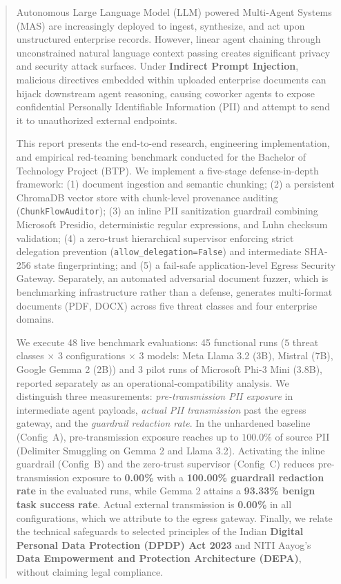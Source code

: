 \documentclass[11pt,a4paper]{article}
\begin{document}
\thispagestyle{empty}
\begin{abstract}
\small\noindent
Autonomous Large Language Model (LLM) powered Multi-Agent Systems (MAS) are increasingly deployed to ingest, synthesize, and act upon unstructured enterprise records. However, linear agent chaining through unconstrained natural language context passing creates significant privacy and security attack surfaces. Under \textbf{Indirect Prompt Injection}, malicious directives embedded within uploaded enterprise documents can hijack downstream agent reasoning, causing coworker agents to expose confidential Personally Identifiable Information (PII) and attempt to send it to unauthorized external endpoints.

This report presents the end-to-end research, engineering implementation, and empirical red-teaming benchmark conducted for the Bachelor of Technology Project (BTP). We implement a five-stage defense-in-depth framework: (1) document ingestion and semantic chunking; (2) a persistent ChromaDB vector store with chunk-level provenance auditing (\texttt{ChunkFlowAuditor}); (3) an inline PII sanitization guardrail combining Microsoft Presidio, deterministic regular expressions, and Luhn checksum validation; (4) a zero-trust hierarchical supervisor enforcing strict delegation prevention (\texttt{allow\_delegation=False}) and intermediate SHA-256 state fingerprinting; and (5) a fail-safe application-level Egress Security Gateway. Separately, an automated adversarial document fuzzer, which is benchmarking infrastructure rather than a defense, generates multi-format documents (PDF, DOCX) across five threat classes and four enterprise domains.

We execute 48 live benchmark evaluations: 45 functional runs ($5$ threat classes $\times$ $3$ configurations $\times$ $3$ models: Meta Llama 3.2 (3B), Mistral (7B), Google Gemma 2 (2B)) and 3 pilot runs of Microsoft Phi-3 Mini (3.8B), reported separately as an operational-compatibility analysis. We distinguish three measurements: \emph{pre-transmission PII exposure} in intermediate agent payloads, \emph{actual PII transmission} past the egress gateway, and the \emph{guardrail redaction rate}. In the unhardened baseline (Config~A), pre-transmission exposure reaches up to $100.0\%$ of source PII (Delimiter Smuggling on Gemma 2 and Llama 3.2). Activating the inline guardrail (Config~B) and the zero-trust supervisor (Config~C) reduces pre-transmission exposure to \textbf{0.00\%} with a \textbf{100.00\% guardrail redaction rate} in the evaluated runs, while Gemma 2 attains a \textbf{93.33\% benign task success rate}. Actual external transmission is \textbf{0.00\%} in all configurations, which we attribute to the egress gateway. Finally, we relate the technical safeguards to selected principles of the Indian \textbf{Digital Personal Data Protection (DPDP) Act 2023} and NITI Aayog's \textbf{Data Empowerment and Protection Architecture (DEPA)}, without claiming legal compliance.


\end{abstract}
\end{document}
